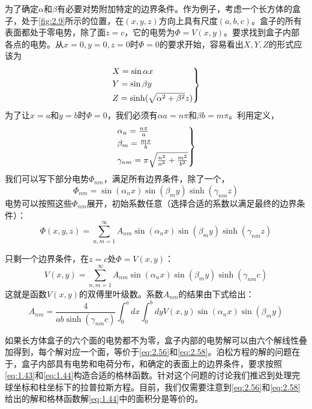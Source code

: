 \documentclass[12pt]{book}
\numberwithin{equation}{chapter}
\numberwithin{figure}{chapter}
\numberwithin{footnote}{page}
\begin{document}
为了确定$\alpha$和$\beta$有必要对势附加特定的边界条件。作为例子，考虑一个长方体的盒子，处于\autoref{fig:2.9}所示的位置，在$(x,y,z)$方向上具有尺度$(a,b,c)$。盒子的所有表面都处于零电势，除了面$z=c$，它的电势为$\Phi=V(x,y)$。要求找到盒子内部各点的电势。从$x=0,y=0,z=0$时$\Phi=0$的要求开始，容易看出$X,Y,Z$的形式应该为
\begin{equation}\label{eq:2.53}
    \begin{rcases*}
        X=\sin \alpha x\\
        Y=\sin \beta y\\
        Z=\sinh(\sqrt{\alpha^2+\beta^2}z)\\
    \end{rcases*}
\end{equation}
为了让$x=a$和$y=b$时$\Phi=0$，我们必须有$\alpha a=n\pi$和$\beta b=m\pi$。利用定义，
\begin{equation}\label{eq:2.54}
    \begin{rcases*}
        \alpha_n=\frac{n\pi}{a}\\
        \beta_m=\frac{m\pi}{b}\\
        \gamma_{nm}=\pi\sqrt{\frac{n^2}{a^2}+\frac{m^2}{b^2}}\\
    \end{rcases*}
\end{equation}
我们可以写下部分电势$\Phi_{nm}$，满足所有边界条件，除了一个，
\begin{equation}\label{eq:2.55}
    \Phi_{nm}=\sin(\alpha_n x)\sin(\beta_m y)\sinh(\gamma_{nm}z)
\end{equation}
电势可以按照这些$\Phi_{nm}$展开，初始系数任意（选择合适的系数以满足最终的边界条件）：
\begin{equation}\label{eq:2.56}
    \Phi(x,y,z)=\sum_{n,m=1}^\infty A_{nm}\sin(\alpha_n x)\sin(\beta_m y)\sinh(\gamma_{nm}z)
\end{equation}

只剩一个边界条件，在$z=c$处$\Phi=V(x,y)$：
\begin{equation}\label{eq:2.57}
    V(x,y)=\sum_{n,m=1}^\infty A_{nm}\sin(\alpha_n x)\sin(\beta_m y)\sinh(\gamma_{nm}c)
\end{equation}
这就是函数$V(x,y)$的双傅里叶级数。系数$A_{nm}$的结果由下式给出：
\begin{equation}\label{eq:2.58}
    A_{nm}=\frac{4}{ab\sinh(\gamma_{nm}c)}\int_0^a dx\int_0^b dy V(x,y)\sin(\alpha_n x)\sin(\beta_m y)
\end{equation}

如果长方体盒子的六个面的电势都不为零，盒子内部的电势解可以由六个解线性叠加得到，每个解对应一个面，等价于\autoref{eq:2.56}和\autoref{eq:2.58}。泊松方程的解的问题在于，盒子内部具有电势和电荷分布，和确定的表面上的边界条件，要求按照\autoref{eq:1.43}和\autoref{eq:1.44}构造合适的格林函数。针对这个问题的讨论我们推迟到处理完球坐标和柱坐标下的拉普拉斯方程。目前，我们仅需要注意到\autoref{eq:2.56}和\autoref{eq:2.58}给出的解和格林函数解\autoref{eq:1.44}中的面积分是等价的。
\end{document}
